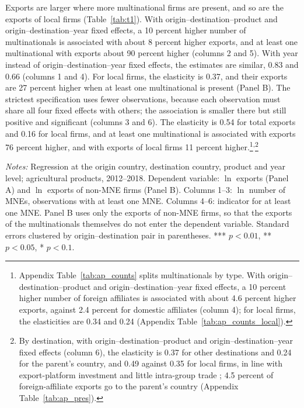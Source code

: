 Exports are larger where more multinational firms are present, and so are the exports of local firms
(Table~\ref{tab:t1}). With origin--destination--product and origin--destination--year fixed effects, a 10 percent
higher number of multinationals is associated with about 8 percent higher exports, and at least one multinational
with exports about 90 percent higher (columns 2 and 5). With year instead of origin--destination--year fixed
effects, the estimates are similar, 0.83 and 0.66 (columns 1 and 4). For local firms, the elasticity is 0.37, and
their exports are 27 percent higher when at least one multinational is present (Panel B). The strictest
specification uses fewer observations, because each observation must share all four fixed effects with others; the
association is smaller there but still positive and significant (columns 3 and 6). The elasticity is 0.54 for total
exports and 0.16 for local firms, and at least one multinational is associated with exports 76 percent higher, and
with exports of local firms 11 percent higher.\footnote{Appendix Table~\ref{tab:ap_counts} splits multinationals by type. With origin--destination--product and origin--destination--year fixed effects, a 10 percent higher number of foreign affiliates is associated with about 4.6 percent higher exports, against 2.4 percent for domestic affiliates (column 4); for local firms, the elasticities are 0.34 and 0.24 (Appendix Table~\ref{tab:ap_counts_local}).}\textsuperscript{,}\footnote{By destination, with origin--destination--product and origin--destination--year fixed effects (column 6), the elasticity is 0.37 for other destinations and 0.24 for the parent's country, and 0.49 against 0.35 for local firms, in line with export-platform investment \citep{ekholm2007} and little intra-group trade \citep{ramondo2016}; 4.5 percent of foreign-affiliate exports go to the parent's country (Appendix Table~\ref{tab:ap_pres}).}

\begin{table}[htbp]
\centering
\caption{Multinational presence and agricultural exports}
\label{tab:t1}
{\footnotesize\setlength{\tabcolsep}{4pt}\setlength{\extrarowheight}{1pt}
}

\begin{minipage}{0.95\linewidth}
\notesize
\vspace{0.6em}
\textit{Notes:} Regression at the origin country, destination country, product and year level; agricultural products, 2012--2018. Dependent variable: $\ln$ exports (Panel A) and $\ln$ exports of non-MNE firms (Panel B). Columns 1--3: $\ln$ number of MNEs, observations with at least one MNE. Columns 4--6: indicator for at least one MNE. Panel B uses only the exports of non-MNE firms, so that the exports of the multinationals themselves do not enter the dependent variable. Standard errors clustered by origin--destination pair in parentheses. *** $p<0.01$, ** $p<0.05$, * $p<0.1$.\\
\srcnote
\end{minipage}
\end{table}


